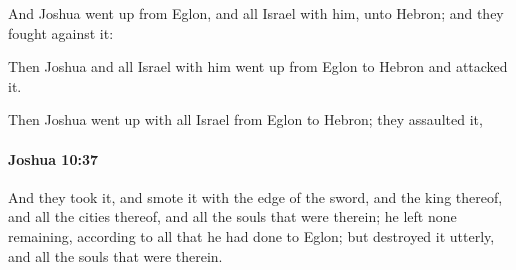 			\begin{versebox}
					\item[BHS] 
					\item[ASV] And Joshua went up from Eglon, and all Israel with him, unto Hebron; and they fought against it:
					\item[NIV] Then Joshua and all Israel with him went up from Eglon to Hebron and attacked it.
					\item[NRSV] Then Joshua went up with all Israel from Eglon to Hebron; they assaulted it,
			\end{versebox}

		\paragraph{Joshua 10:37} %
			\label{JOSHUA-10-37}

			And they took it, and smote it with the edge of the sword, and the king thereof, and all the cities thereof, and all the souls that were therein; he left none remaining, according to all that he had done to Eglon; but destroyed it utterly, and all the souls that were therein.

